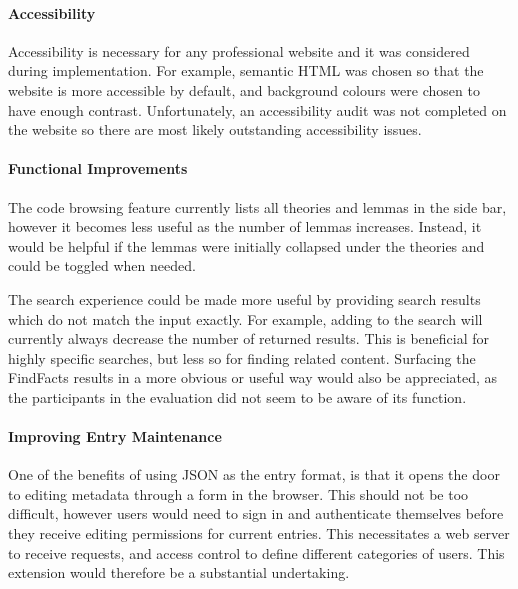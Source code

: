 \documentclass[bsc,frontabs,oneside,singlespacing,parskip,deptreport,logo]{infthesis}
\begin{document}
\paragraph*{Accessibility}

Accessibility is necessary for any professional website \cite{henry_accessibility_2021} and it was considered during implementation. For example, semantic HTML was chosen so that the website is more accessible by default, and background colours were chosen to have enough contrast. Unfortunately, an accessibility audit was not completed on the website so there are most likely outstanding accessibility issues.

\paragraph*{Functional Improvements}

The code browsing feature currently lists all theories and lemmas in the side bar, however it becomes less useful as the number of lemmas increases. Instead, it would be helpful if the lemmas were initially collapsed under the theories and could be toggled when needed.

The search experience could be made more useful by providing search results which do not match the input exactly. For example, adding to the search will currently always decrease the number of returned results. This is beneficial for highly specific searches, but less so for finding related content. Surfacing the FindFacts results in a more obvious or useful way would also be appreciated, as the participants in the evaluation did not seem to be aware of its function.

\paragraph*{Improving Entry Maintenance}

One of the benefits of using JSON as the entry format, is that it opens the door to editing metadata through a form in the browser. This should not be too difficult, however users would need to sign in and authenticate themselves before they receive editing permissions for current entries. This necessitates a web server to receive requests, and access control to define different categories of users. This extension would therefore be a substantial undertaking.

\end{document}
